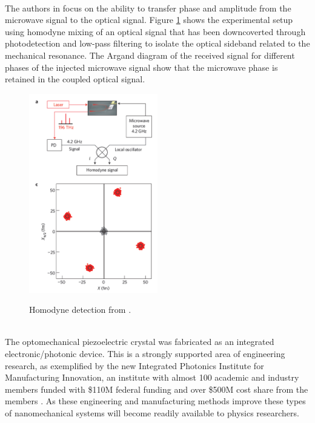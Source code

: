 \documentclass[a4paper,11pt, twocolumn]{article}
\numberwithin{equation}{section}
\begin{document}
\\
The authors in \cite{nanoCrystal} focus on the ability to transfer phase and amplitude from the microwave signal to the optical signal.
Figure \ref{fig:homodyne} shows the experimental setup using homodyne mixing of an optical signal that has been downcoverted through photodetection and low-pass filtering to isolate the optical sideband related to the mechanical resonance.
The Argand diagram of the received signal for different phases of the injected microwave signal show that the microwave phase is retained in the coupled optical signal.
\begin{figure}[ht]
 \caption{Homodyne detection from \cite{nanoCrystal}.}
 \centering
   \includegraphics[width=0.5\textwidth]{figs/CrystalMixing}
 \label{fig:homodyne}
\end{figure}
\\
The optomechanical piezoelectric crystal was fabricated as an integrated electronic/photonic device.
This is a strongly supported area of engineering research, as exemplified by the new Integrated Photonics Institute for Manufacturing Innovation, 
an institute with almost 100 academic and industry members funded with \$110M federal funding and over \$500M cost share from the members \cite{ipimi}.
As these engineering and manufacturing methods improve these types of nanomechanical systems will become readily available to physics researchers.
\end{document}
